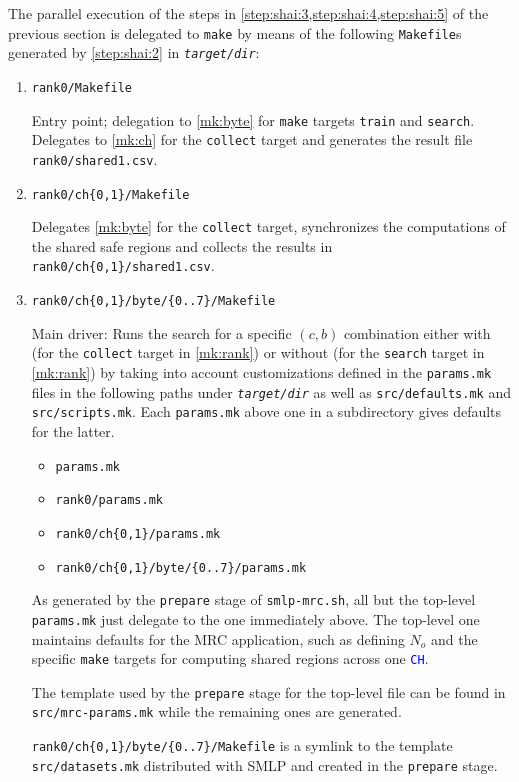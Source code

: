 \documentclass[a4paper,parskip=half]{article} %
\newcommand*\cmdstyle\texttt
\newcommand*\file\cmdstyle
\newcommand*\literalColor{blue}
\newcommand*\cmd[1]{\cmdstyle{\textcolor{red!85!black}{#1}}}
\newcommand*\literal[1]{\textcolor{\literalColor}{\cmdstyle{#1}}}
\newcommand*\SolverAbbrvText{SMLP}
\newcommand*\SolverAbbrv{\SolverAbbrvText\xspace}
\newcommand*\progmrc{smlp-mrc.sh}
\begin{document}
The parallel execution of the steps in
\cref{step:shai:3,step:shai:4,step:shai:5} of the previous section
is delegated to \cmd{make} by means of the
following \file{Makefile}s generated by \cref{step:shai:2} in
\emph{\file{target/dir}}:
\begin{enumerate}
\item\label{mk:rank} \file{rank0/Makefile}

	Entry point; delegation to \cref{mk:byte} for \cmd{make} targets
	\cmdstyle{train} and \cmdstyle{search}.
	Delegates to \cref{mk:ch} for the \cmdstyle{collect} target and
	generates the result file \file{rank0/shared1.csv}.

\item\label{mk:ch} \file{rank0/ch\{0,1\}/Makefile}

	Delegates \cref{mk:byte} for the \cmdstyle{collect} target,
	synchronizes the computations of the shared safe regions and
	collects the results in \file{rank0/ch\{0,1\}/shared1.csv}.

\item\label{mk:byte} \file{rank0/ch\{0,1\}/byte/\{0..7\}/Makefile}

	Main driver: Runs the search for a specific $(c,b)$ combination either
	with (for the \cmdstyle{collect} target in \cref{mk:rank}) or without
	(for the \cmdstyle{search} target in \cref{mk:rank}) by taking into
	account customizations defined in the \file{params.mk} files in the
	following paths under \emph{\file{target/dir}} as well as
	\file{src/defaults.mk} and \file{src/scripts.mk}.
	Each \file{params.mk} above one in a subdirectory gives defaults for
	the latter.

	\begin{itemize}
	\item\file{params.mk}
	\item\file{rank0/params.mk}
	\item\file{rank0/ch\{0,1\}/params.mk}
	\item\file{rank0/ch\{0,1\}/byte/\{0..7\}/params.mk}
	\end{itemize}

	As generated by the \cmdstyle{prepare} stage of \cmd{\progmrc},
	all but the top-level \file{params.mk} just delegate to the one
	immediately above. The top-level one maintains defaults for the MRC
	application, such as defining $N_o$ and the specific \cmd{make} targets
	for computing shared regions across one \literal{CH}.

	The template used by the \cmdstyle{prepare} stage for the top-level file
	can be found in \file{src/mrc-params.mk} while the remaining ones are
	generated. %

	\file{rank0/ch\{0,1\}/byte/\{0..7\}/Makefile} is a symlink to the
	template \file{src/datasets.mk} distributed with \SolverAbbrv and
	created in the \cmdstyle{prepare} stage.
\end{enumerate}
\end{document}
